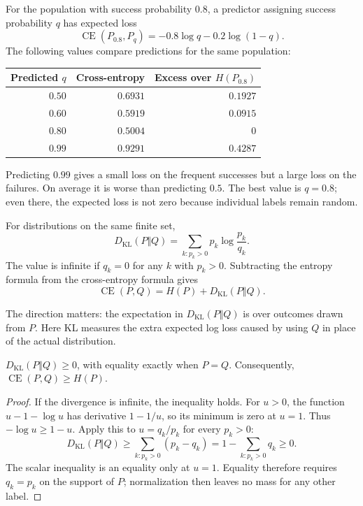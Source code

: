 For the population with success probability \(0.8\), a predictor assigning
success probability \(q\) has expected loss
\[
  \operatorname{CE}(P_{0.8},P_q)
  =-0.8\log q-0.2\log(1-q).
\]
The following values compare predictions for the same population:
\begin{center}
  \begin{tabular}{@{}rrr@{}}
    \toprule
    Predicted \(q\) & Cross-entropy & Excess over \(H(P_{0.8})\)\\
    \midrule
    \(0.50\) & \(0.6931\) & \(0.1927\)\\
    \(0.60\) & \(0.5919\) & \(0.0915\)\\
    \(0.80\) & \(0.5004\) & \(0\)\\
    \(0.99\) & \(0.9291\) & \(0.4287\)\\
    \bottomrule
  \end{tabular}
\end{center}
Predicting \(0.99\) gives a small loss on the frequent successes but a
large loss on the failures. On average it is worse than predicting \(0.5\).
The best value is \(q=0.8\); even there, the expected loss is not zero
because individual labels remain random.

\begin{definition}
For distributions on the same finite set,
\begin{equation}
  D_{\mathrm{KL}}(P\Vert Q)
  =\sum_{k:p_k>0}p_k\log\frac{p_k}{q_k}.
  \label{eq:kl}
\end{equation}
The value is infinite if \(q_k=0\) for any \(k\) with \(p_k>0\).
Subtracting the entropy formula from the cross-entropy formula gives
\begin{equation}
  \operatorname{CE}(P,Q)=H(P)+D_{\mathrm{KL}}(P\Vert Q).
  \label{eq:ce-entropy-kl}
\end{equation}
\end{definition}

The direction matters: the expectation in \(D_{\mathrm{KL}}(P\Vert Q)\)
is over outcomes drawn from \(P\). Here KL measures the extra expected
log loss caused by using \(Q\) in place of the actual distribution.

\begin{result}[Nonnegativity]
\(D_{\mathrm{KL}}(P\Vert Q)\ge0\), with equality exactly when \(P=Q\).
Consequently, \(\operatorname{CE}(P,Q)\ge H(P)\).
\end{result}

\begin{proof}
If the divergence is infinite, the inequality holds. For \(u>0\), the
function \(u-1-\log u\) has derivative \(1-1/u\), so its minimum is zero
at \(u=1\). Thus \(-\log u\ge1-u\). Apply this to
\(u=q_k/p_k\) for every \(p_k>0\):
\[
  D_{\mathrm{KL}}(P\Vert Q)
  \ge\sum_{k:p_k>0}(p_k-q_k)
  =1-\sum_{k:p_k>0}q_k\ge0.
\]
The scalar inequality is an equality only at \(u=1\).
Equality therefore requires \(q_k=p_k\) on the support of \(P\);
normalization then leaves no mass for any other label.
\end{proof}

